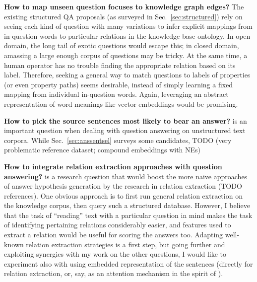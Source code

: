 \textbf{How to map unseen question focuses to knowledge graph edges?}
The existing structured QA proposals (as surveyed in Sec.~\ref{sec:structured})
rely on seeing each kind of question with many variations to infer explicit mappings
from in-question words to particular relations in the knowledge base ontology.
In open domain, the long tail of exotic questions would escape this;
in closed domain, amassing a large enough corpus of questions may be tricky.
At the same time, a human operator has no trouble finding the appropriate
relation based on its label.
Therefore, seeking a general way to match questions to labels of properties
(or even property paths) seems desirable, instead of simply learning a fixed
mapping from individual in-question words.
Again, leveraging an abstract representation of word meanings like vector
embeddings would be promising.

\textbf{How to pick the source sentences most likely to bear an answer?}
is an important question when dealing with question answering on unstructured
text corpora.  While Sec.~\ref{sec:anssentsel} surveys some candidates,
TODO (very problematic reference dataset; compound embeddings with NEs)

\textbf{How to integrate relation extraction approaches with question answering?}
is a research question that would boost the more naive approaches of answer
hypothesis generation by the research in relation extraction (TODO references).
One obvious approach is to first run general relation extraction on the knowledge
corpus, then query such a structured database.  However, I believe that the task
of ``reading'' text with a particular question in mind makes the task of identifying
pertaining relations considerably easier, and features used to extract a relation
would be useful for scoring the answers too.
Adapting well-known relation extraction strategies is a first step,
but going further and exploiting synergies with my work on the other questions,
I would like to experiment also with using embedded representation
of the sentences
(directly for relation extraction, or, say, as an attention mechanism
in the spirit of \cite{ReadAndComprehend}).

